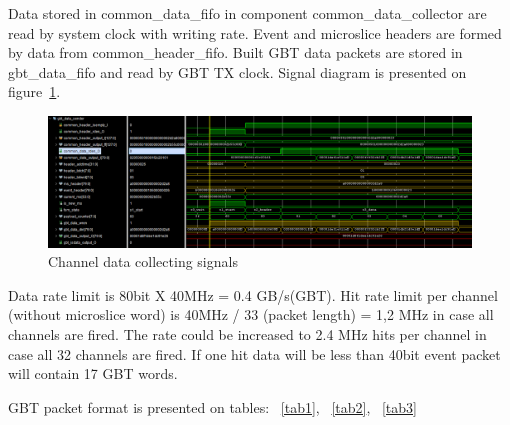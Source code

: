 \documentclass{article}
\begin{document}
Data stored in common\_data\_fifo in component common\_data\_collector are read by system clock with writing rate. Event and microslice headers are formed by data from common\_header\_fifo. Built GBT data packets are stored in gbt\_data\_fifo and read by GBT TX clock. Signal diagram is presented on figure~\ref{fig:8}. 


\begin{figure}[H]
	\centering 
	\includegraphics[width=1.0\textwidth]{GBT_sender_wave.png}
	\caption{\label{fig:8} Channel data collecting signals}
\end{figure}



Data rate limit is 80bit X 40MHz = 0.4 GB/s(GBT). Hit rate limit per channel (without microslice word) is 40MHz / 33 (packet length) = 1,2 MHz in case all channels are fired. The rate could be increased to  2.4 MHz hits per channel in case all 32 channels are fired. If one hit data will be less than 40bit event packet will contain 17 GBT words.

GBT packet format is presented on tables: ~\ref{tab1}, ~\ref{tab2}, ~\ref{tab3}
\end{document}
